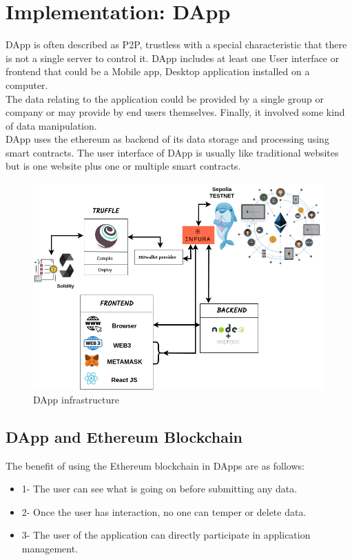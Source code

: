 \chapter{Implementation: DApp}
DApp is often described as P2P, trustless with a special characteristic that there is not a single server to control it. DApp includes at least one User interface or frontend that could be a Mobile app, Desktop application installed on a computer.\\
The data relating to the application could be provided by a single group or company or may provide by end users themselves. Finally, it involved some kind of data manipulation. \\
DApp uses the ethereum as backend of its data storage and processing using smart contracts. The user interface of DApp is usually like traditional websites but is one website plus one or multiple smart contracts.

\begin{center}
	
	\begin{figure}[htb!]
		
		\begin{minipage}{0.75\linewidth}
			
			\includegraphics[width=1.45\textwidth]{images/chap03_dapp.png}
		\end{minipage}
		\caption{DApp infrastructure}
		
	\end{figure}
	
\end{center}

\section{DApp and Ethereum Blockchain}
The benefit of using the Ethereum blockchain in DApps are as follows:
 \begin{itemize}
     \item 1- The user can see what is going on before submitting any data.
     \item 2- Once the user has interaction, no one can temper or delete data.
     \item 3- The user of the application can directly participate in application management.
 \end{itemize}
